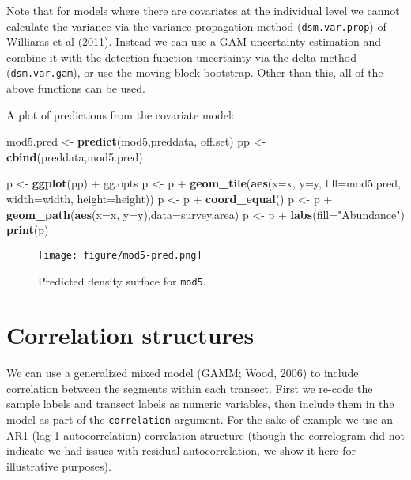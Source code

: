 \documentclass[]{article}
\newenvironment{Shaded}{}{}
\newcommand{\KeywordTok}[1]{\textcolor[rgb]{0.00,0.44,0.13}{\textbf{{#1}}}}
\newcommand{\DataTypeTok}[1]{\textcolor[rgb]{0.56,0.13,0.00}{{#1}}}
\newcommand{\StringTok}[1]{\textcolor[rgb]{0.25,0.44,0.63}{{#1}}}
\newcommand{\NormalTok}[1]{{#1}}
\begin{document}
Note that for models where there are covariates at the individual level
we cannot calculate the variance via the variance propagation method
(\texttt{dsm.var.prop}) of Williams et al (2011). Instead we can use a
GAM uncertainty estimation and combine it with the detection function
uncertainty via the delta method (\texttt{dsm.var.gam}), or use the
moving block bootstrap. Other than this, all of the above functions can
be used.

A plot of predictions from the covariate model:

\begin{Shaded}
\begin{Highlighting}[]
\NormalTok{mod5.pred <-}\StringTok{ }\KeywordTok{predict}\NormalTok{(mod5,preddata, off.set)}
\NormalTok{pp <-}\StringTok{ }\KeywordTok{cbind}\NormalTok{(preddata,mod5.pred)}

\NormalTok{p <-}\StringTok{ }\KeywordTok{ggplot}\NormalTok{(pp) +}\StringTok{ }\NormalTok{gg.opts}
\NormalTok{p <-}\StringTok{ }\NormalTok{p +}\StringTok{ }\KeywordTok{geom_tile}\NormalTok{(}\KeywordTok{aes}\NormalTok{(}\DataTypeTok{x=}\NormalTok{x, }\DataTypeTok{y=}\NormalTok{y, }\DataTypeTok{fill=}\NormalTok{mod5.pred,}
\DataTypeTok{width=}\NormalTok{width, }\DataTypeTok{height=}\NormalTok{height))}
\NormalTok{p <-}\StringTok{ }\NormalTok{p +}\StringTok{ }\KeywordTok{coord_equal}\NormalTok{()}
\NormalTok{p <-}\StringTok{ }\NormalTok{p +}\StringTok{ }\KeywordTok{geom_path}\NormalTok{(}\KeywordTok{aes}\NormalTok{(}\DataTypeTok{x=}\NormalTok{x, }\DataTypeTok{y=}\NormalTok{y),}\DataTypeTok{data=}\NormalTok{survey.area)}
\NormalTok{p <-}\StringTok{ }\NormalTok{p +}\StringTok{ }\KeywordTok{labs}\NormalTok{(}\DataTypeTok{fill=}\StringTok{"Abundance"}\NormalTok{)}
\KeywordTok{print}\NormalTok{(p)}
\end{Highlighting}
\end{Shaded}

\begin{figure}[htbp]
\centering
\texttt{[image: figure/mod5-pred.png]}
\caption{Predicted density surface for \texttt{mod5}.}
\end{figure}

\section{Correlation structures}\label{correlation-structures}

We can use a generalized mixed model (GAMM; Wood, 2006) to include
correlation between the segments within each transect. First we re-code
the sample labels and transect labels as numeric variables, then include
them in the model as part of the \texttt{correlation} argument. For the
sake of example we use an AR1 (lag 1 autocorrelation) correlation
structure (though the correlogram did not indicate we had issues with
residual autocorrelation, we show it here for illustrative purposes).
\end{document}
